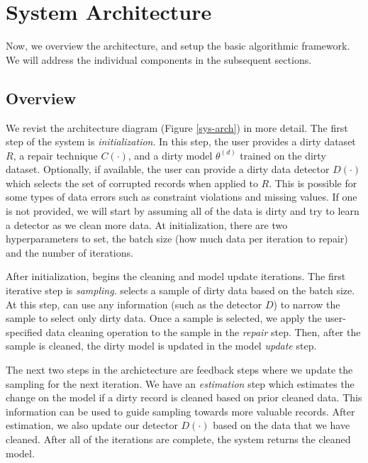 \section{System Architecture}\label{arch}
Now, we overview the \sys architecture, and setup the basic algorithmic framework.
We will address the individual components in the subsequent sections.

\subsection{Overview}
We revist the architecture diagram (Figure \ref{sys-arch}) in more detail.
The first step of the system is \emph{initialization}.
In this step, the user provides a dirty dataset $R$, a repair technique $C(\cdot)$, and a dirty model $\theta^{(d)}$ trained on the dirty dataset. 
Optionally, if available, the user can provide a dirty data detector $D(\cdot)$ which selects the set of corrupted records when applied to $R$.
This is possible for some types of data errors such as constraint violations and missing values.
If one is not provided, we will start by assuming all of the data is dirty and try to learn a detector as we clean more data.
At initialization, there are two hyperparameters to set, the batch size (how much data per iteration to repair) and the number of iterations.

After initialization, \sys begins the cleaning and model update iterations.
The first iterative step is \emph{sampling}.
\sys selects a sample of dirty data based on the batch size.
At this step, \sys can use any information (such as the detector $D$) to narrow the sample to select only dirty data.
Once a sample is selected, we apply the user-specified data cleaning operation to the sample in the \emph{repair} step.
Then, after the sample is cleaned, the dirty model is updated in the model \emph{update} step.

The next two steps in the archictecture are feedback steps where we update the sampling for the next iteration.
We have an \emph{estimation} step which estimates the change on the model if a dirty record is cleaned based on prior cleaned data.
This information can be used to guide sampling towards more valuable records.
After estimation, we also update our detector $D(\cdot)$ based on the data that we have cleaned.
After all of the iterations are complete, the system returns the cleaned model.

